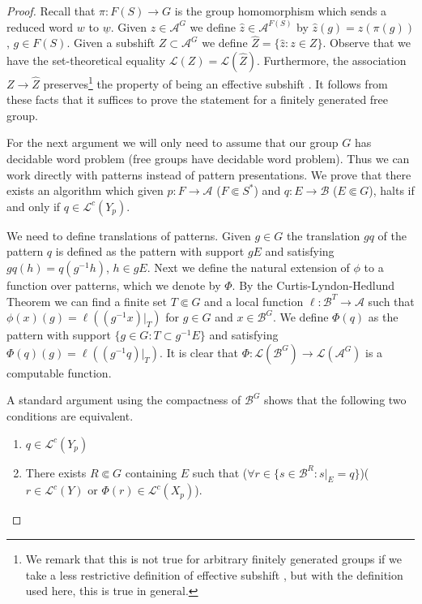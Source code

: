 \documentclass[a4paper,oneside]{amsart}
\renewcommand{\(}{\begin{dmath*}}
\renewcommand{\)}{\end{dmath*}}
\theoremstyle{definition}
\newcommand{\Le}{\mathcal{L}}
\newcommand{\Lep}{\mathscr{L}}
\newcommand{\A}{\mathcal{A}}
\newcommand{\B}{\mathcal{B}}
\begin{document}
\begin{proof}

Recall that $\pi\colon F(S)\to G$ is the group homomorphism which sends a reduced word $w$ to $\underline{w}$. Given $z\in \A^G$ we define $\hat z\in\A^{F(S)}$ by $\hat z(g)=z(\pi(g))$, $g\in F(S)$. Given a subshift $Z\subset \A^G$ we define $\hat{Z}=\{\hat z : z\in Z\}$. Observe that we have the set-theoretical equality $\Lep(Z)=\Lep(\hat Z)$. Furthermore, the association $Z\to\hat Z$ preserves\footnote{We remark that this is not true for arbitrary finitely generated groups if we take a less restrictive definition of effective subshift \cite[Proposition 7.1]{barbieri_effective_2025}, but with the definition used here, this is true in general.} the property of being an effective subshift  \cite[\S 3.3 and \S 7] {barbieri_effective_2025}. It follows from these facts that it suffices to prove the statement for a finitely generated free group. 

For the next argument we will only need to assume that our group $G$ has decidable word problem (free groups have decidable word problem). Thus we can work directly with patterns instead of pattern presentations.  We prove that there exists an algorithm which given $p\colon F\to \A$ ($F\Subset S^\ast$) and $q\colon E\to\B$ ($E\Subset G$), halts if and only if $q\in \Le^c(Y_p)$. 

We need to define translations of patterns. Given $g\in G$ the translation $gq$ of the pattern $q$ is defined as the pattern with support $gE$ and satisfying $gq(h)=q(g^{-1}h)$, $h\in gE$. Next we  define the natural extension of $\phi$ to a function over patterns, which we denote by $\Phi$. By the Curtis-Lyndon-Hedlund Theorem we can find a finite set $T\Subset G$ and a local function $\ell\colon \B^T\to \A$ such that $\phi(x)(g)=\ell((g^{-1}x)|_T)$ for $g\in G$ and $x\in \B^G$. We define $\Phi(q)$ as the pattern with support $\{g\in G : T\subset g^{-1}E\}$ and satisfying $\Phi(q)(g)= \ell((g^{-1}q)|_T)$. It is clear that $\Phi\colon \Le(\B^G)\to\Le(\A^G)$ is a computable function.   

A standard argument using the compactness of $\B^G$ shows that the following two conditions are equivalent. 
\begin{enumerate}
    \item $q\in \Le^c(Y_p)$
    \item There exists  $R\Subset G$ containing $E$ such that ($\forall r\in \{s\in \B^R : s|_E=q\}$)($r\in \Le^c(Y)$  or $\Phi(r)\in \Le^c(X_p)$). 


\end{enumerate}
\end{proof}
\end{document}
